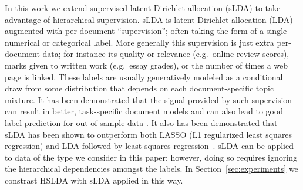 In this work we extend supervised latent Dirichlet allocation (sLDA) \cite{BleiMcAuliffe2008} to take advantage of hierarchical supervision.  sLDA is latent Dirichlet allocation (LDA) \cite{Blei2003} augmented with per document ``supervision'';  often taking the form of a single numerical or categorical label. More generally this supervision is just extra per-document data;  for instance its quality or relevance (e.g.~online review scores), marks given to written work (e.g.~essay grades), or the number of times a web page is linked.  These labels are usually generatively modeled as a conditional draw from some distribution that depends on each document-specific topic mixture.  It has been demonstrated that the signal provided by such supervision can result in better, task-specific document models and can also lead to good label prediction for out-of-sample data \cite{BleiMcAuliffe2008}.  It also has been demonstrated that sLDA has been shown to outperform both LASSO
(L1 regularized least squares regression) and LDA followed by least
squares regression~\cite{BleiMcAuliffe2008}.  sLDA can be applied to data of the type we consider in this paper; however, doing so requires ignoring the hierarchical dependencies amongst the labels.  In Section~\ref{sec:experiments} we constrast HSLDA with sLDA applied in this way.  





